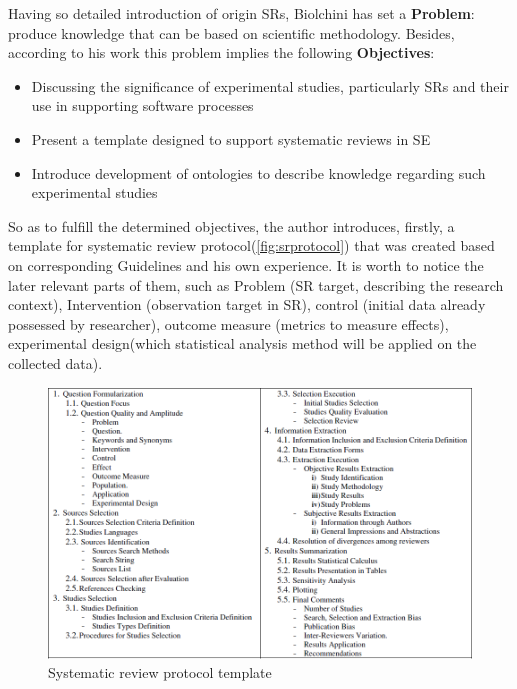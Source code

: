 	Having so detailed introduction of origin SRs, Biolchini has set a \textbf{Problem}: produce knowledge that can be based on scientific methodology. Besides, according to his work this problem implies the following \textbf{Objectives}:
		\begin{itemize}
			\item Discussing the significance of experimental studies, particularly SRs and their use in supporting software processes
			\item Present a template designed to support systematic reviews in SE
			\item Introduce development of ontologies to describe knowledge regarding such experimental studies
		\end{itemize}
	\label{sec:OntSRinSE:guidelines}    
	So as to fulfill the determined objectives, the author introduces, firstly, a template for systematic review protocol(\autoref{fig:srprotocol}) that was created based on corresponding Guidelines\cite{Kit07} and his own experience. It is worth to notice the later relevant parts of them, such as Problem (SR target, describing the research context), Intervention (observation target in SR), control (initial data already possessed by researcher), outcome measure (metrics to measure effects), experimental design(which statistical analysis method will be applied on the collected data).
	\begin{figure}
		\centering
		\includegraphics[width=15cm]{images/SRreviewprotocol.PNG}
		\caption{Systematic review protocol template\cite[p. 142]{Bio07}}
		\label{fig:srprotocol}
	\end{figure}
	 \newline
	
